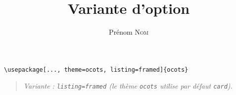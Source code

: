 \documentclass[11pt]{ocots-book}
\title{Variante d'option}
\author{Prénom \textsc{Nom}}
\newcommand{\ocotsvariantnote}[1]{\begin{quote}\itshape Variante : #1\end{quote}}
\begin{document}
\maketitle

\begin{lstlisting}
\usepackage[..., theme=ocots, listing=framed]{ocots}
\end{lstlisting}
\ocotsvariantnote{\texttt{listing=framed} (le th\`eme \texttt{ocots} utilise par d\'efaut \texttt{card}).}

\end{document}
